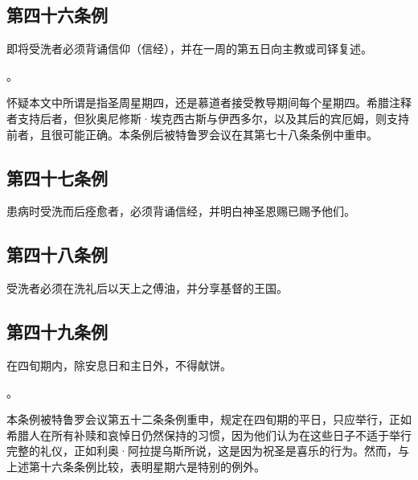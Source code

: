 
\subsection{第四十六条例}

即将受洗者必须背诵信仰（信经），并在一周的第五日向主教或司铎复述。\par

。\par

怀疑本文中所谓是指圣周星期四，还是慕道者接受教导期间每个星期四。希腊注释者支持后者，但狄奥尼修斯·埃克西古斯与伊西多尔，以及其后的宾厄姆，则支持前者，且很可能正确。本条例后被特鲁罗会议在其第七十八条条例中重申。\par


\subsection{第四十七条例}

患病时受洗而后痊愈者，必须背诵信经，并明白神圣恩赐已赐予他们。\par


\subsection{第四十八条例}

受洗者必须在洗礼后以天上之傅油，并分享基督的王国。\par


\subsection{第四十九条例}

在四旬期内，除安息日和主日外，不得献饼。\par

。\par

本条例被特鲁罗会议第五十二条条例重申，规定在四旬期的平日，只应举行，正如希腊人在所有补赎和哀悼日仍然保持的习惯，因为他们认为在这些日子不适于举行完整的礼仪，正如利奥·阿拉提乌斯所说，这是因为祝圣是喜乐的行为。然而，与上述第十六条条例比较，表明星期六是特别的例外。\par

